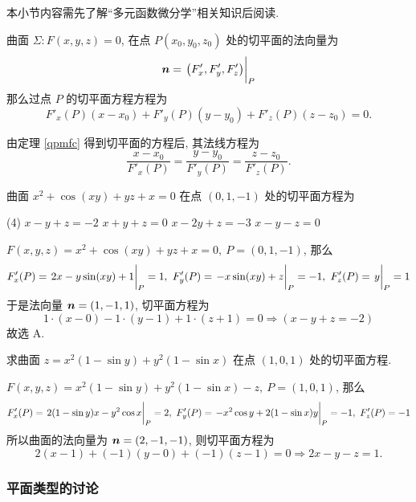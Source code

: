 本小节内容需先了解“多元函数微分学”相关知识后阅读.

\begin{theorem}[切平面方程]
    曲面 $\varSigma:F(x,y,z)=0$, 在点 $P(x_0,y_0,z_0)$ 处的切平面的法向量为
    \label{qpmfc}
    $$\vb*{n}=\eval{\qty(F'_x,F'_y,F'_z)}_{P}$$
    那么过点 $P$ 的切平面方程方程为
    $$F'_x(P)(x-x_0)+F'_y(P)(y-y_0)+F'_z(P)(z-z_0)=0.$$
\end{theorem}

\begin{theorem}[法线方程]
    由定理 \ref{qpmfc} 得到切平面的方程后, 其法线方程为 $$\dfrac{x-x_0}{F'_x(P)}=\dfrac{y-y_0}{F'_y(P)}=\dfrac{z-z_0}{F'_z(P)}.$$
\end{theorem}

\begin{example}[2013 数一]
    曲面 $x^2+\cos(xy)+yz+x=0$ 在点 $(0,1,-1)$ 处的切平面方程为
    \begin{tasks}(4)
        \task $x-y+z=-2$
        \task $x+y+z=0$
        \task $x-2y+z=-3$
        \task $x-y-z=0$
    \end{tasks}
\end{example}
\begin{solution}
    $F(x,y,z)=x^2+\cos(xy)+yz+x=0,~P=(0,1,-1)$, 那么
    $$F'_x(P)=\eval{2x-y\sin(xy)+1}_{P}=1,~F'_y(P)=\eval{-x\sin(xy)+z}_{P}=-1,~F'_z(P)=\eval{y}_{P}=1$$
    于是法向量 $\vb*{n}=(1,-1,1)$, 切平面方程为 $$1\cdot(x-0)-1\cdot(y-1)+1\cdot(z+1)=0\Rightarrow(x-y+z=-2)$$
    故选 A.
\end{solution}

\begin{example}[2014 数一]
    求曲面 $z=x^2(1-\sin y)+y^2(1-\sin x)$ 在点 $(1,0,1)$ 处的切平面方程.
\end{example}
\begin{solution}
    $F(x,y,z)=x^2(1-\sin y)+y^2(1-\sin x)-z,~P=(1,0,1)$, 那么
    $$F'_x(P)=\eval{2(1-\sin y)x-y^2\cos x}_{P}=2,~F'_y(P)=\eval{-x^2\cos y+2(1-\sin x)y}_{P}=-1,~F'_z(P)=-1$$
    所以曲面的法向量为 $\vb*{n}=(2,-1,-1)$, 则切平面方程为 $$2(x-1)+(-1)(y-0)+(-1)(z-1)=0\Rightarrow 2x-y-z=1.$$
\end{solution}

\subsubsection{平面类型的讨论}

